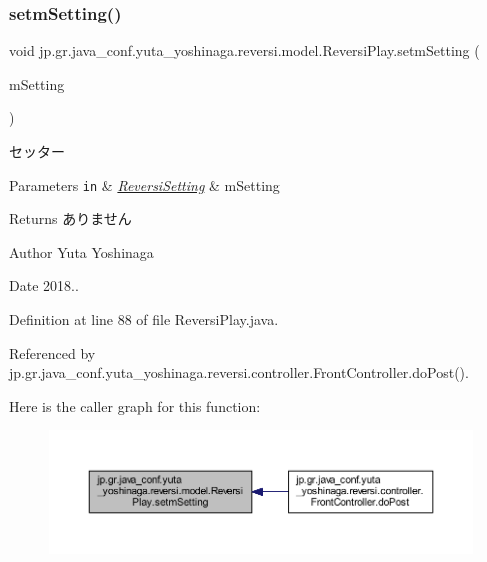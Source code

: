 \subsubsection{\texorpdfstring{setm\+Setting()}{setmSetting()}}
{\footnotesize\ttfamily void jp.\+gr.\+java\+\_\+conf.\+yuta\+\_\+yoshinaga.\+reversi.\+model.\+Reversi\+Play.\+setm\+Setting (\begin{DoxyParamCaption}\item[{\hyperlink{classjp_1_1gr_1_1java__conf_1_1yuta__yoshinaga_1_1reversi_1_1model_1_1_reversi_setting}{Reversi\+Setting}}]{m\+Setting }\end{DoxyParamCaption})}



セッター 


\begin{DoxyParams}[1]{Parameters}
\mbox{\tt in}  & {\em \hyperlink{classjp_1_1gr_1_1java__conf_1_1yuta__yoshinaga_1_1reversi_1_1model_1_1_reversi_setting}{Reversi\+Setting}} & m\+Setting \\
\hline
\end{DoxyParams}
\begin{DoxyReturn}{Returns}
ありません 
\end{DoxyReturn}
\begin{DoxyAuthor}{Author}
Yuta Yoshinaga 
\end{DoxyAuthor}
\begin{DoxyDate}{Date}
2018.. 
\end{DoxyDate}


Definition at line 88 of file Reversi\+Play.\+java.



Referenced by jp.\+gr.\+java\+\_\+conf.\+yuta\+\_\+yoshinaga.\+reversi.\+controller.\+Front\+Controller.\+do\+Post().

Here is the caller graph for this function\+:
\nopagebreak
\begin{figure}[H]
\begin{center}
\leavevmode
\includegraphics[width=350pt]{classjp_1_1gr_1_1java__conf_1_1yuta__yoshinaga_1_1reversi_1_1model_1_1_reversi_play_a8c791a59db891596f7358ddf66b1c2d9_icgraph}
\end{center}
\end{figure}
\mbox{\label{classjp_1_1gr_1_1java__conf_1_1yuta__yoshinaga_1_1reversi_1_1model_1_1_reversi_play_ac0a21805d156fefa61576a64715ac778}} 
